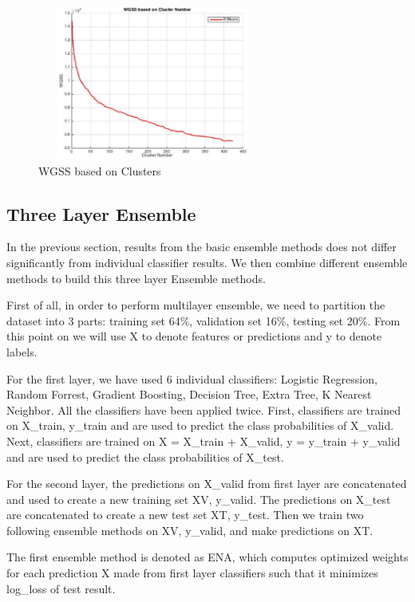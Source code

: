 \documentclass{sig-alternate-05-2015}
\begin{document}
\begin{figure}[!htb]
\centering
\includegraphics[height=2in,width=3in]{K_Means}
\caption{WGSS based on Clusters}
\label{fig:k means}
\end{figure}

\FloatBarrier
\subsection{Three Layer Ensemble}
In the previous section, results from the basic ensemble methods does not differ significantly from individual classifier results. We then combine different ensemble methods to build this three layer Ensemble methods\cite{3layer}.

First of all, in order to perform multilayer ensemble, we need to partition the dataset into 3 parts: training set 64\%, validation set 16\%, testing set 20\%. From this point on we will use X to denote features or predictions and y to denote labels.

For the first layer, we have used 6 individual classifiers: Logistic Regression, Random Forrest, Gradient Boosting, Decision Tree, Extra Tree, K Nearest Neighbor. All the classifiers have been applied twice. First, classifiers are trained on X\_train, y\_train and are used to predict the class probabilities of X\_valid. Next, classifiers are trained on X = X\_train + X\_valid, y = y\_train + y\_valid and are used to predict the class probabilities of X\_test.

For the second layer, the predictions on X\_valid from first layer are concatenated and used to create a new training set XV, y\_valid. The predictions on X\_test are concatenated to create a new test set XT, y\_test. Then we train two following ensemble methods on XV, y\_valid, and make predictions on XT.

The first ensemble method is denoted as ENA, which computes optimized weights for each prediction X made from first layer classifiers such that it minimizes log\_loss of test result.
\end{document}
